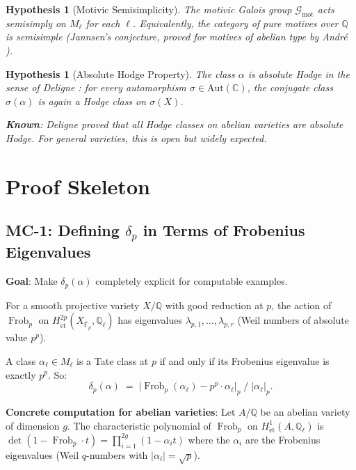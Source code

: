 \documentclass[11pt]{article}
\newtheorem{hypothesis}[lemma]{Hypothesis}
\theoremstyle{definition}
\DeclareMathOperator{\Frob}{Frob}
\begin{document}
\begin{hypothesis}[Motivic Semisimplicity]
\label{hyp:semisimple}
The motivic Galois group $\mathcal{G}_{\mathrm{mot}}$ acts semisimply on
$M_\ell$ for each $\ell$.  Equivalently, the category of pure motives over $\mathbb{Q}$
is semisimple (Jannsen's conjecture, proved for motives of abelian type by Andr\'e \cite{Andre}).
\end{hypothesis}

\begin{hypothesis}[Absolute Hodge Property]
\label{hyp:abs-hodge}
The class $\alpha$ is \emph{absolute Hodge} in the sense of Deligne \cite{Deligne}:
for every automorphism $\sigma \in \mathrm{Aut}(\mathbb{C})$,
the conjugate class $\sigma(\alpha)$ is again a Hodge class on $\sigma(X)$.

\textbf{Known}: Deligne proved that all Hodge classes on abelian varieties are absolute Hodge.
For general varieties, this is open but widely expected.
\end{hypothesis}

\section{Proof Skeleton}

\subsection{MC-1: Defining $\delta_p$ in Terms of Frobenius Eigenvalues}

\textbf{Goal}: Make $\delta_p(\alpha)$ completely explicit for computable examples.

For a smooth projective variety $X/\mathbb{Q}$ with good reduction at $p$,
the action of $\Frob_p$ on $H^{2p}_{\mathrm{\acute{e}t}}(X_{\bar{\mathbb{F}}_p}, \mathbb{Q}_\ell)$
has eigenvalues $\lambda_{p,1}, \ldots, \lambda_{p,r}$ (Weil numbers of absolute value $p^p$).

A class $\alpha_\ell \in M_\ell$ is a Tate class at $p$ if and only if its Frobenius eigenvalue
is exactly $p^p$.  So:
\[
  \delta_p(\alpha) \;=\; \bigl| \Frob_p(\alpha_\ell) - p^p \cdot \alpha_\ell \bigr|_p \;/\; |\alpha_\ell|_p.
\]

\textbf{Concrete computation for abelian varieties}:
Let $A/\mathbb{Q}$ be an abelian variety of dimension $g$.
The characteristic polynomial of $\Frob_p$ on $H^1_{\mathrm{\acute{e}t}}(A, \mathbb{Q}_\ell)$
is $\det(1 - \Frob_p \cdot t) = \prod_{i=1}^{2g}(1 - \alpha_i t)$
where the $\alpha_i$ are the Frobenius eigenvalues (Weil $q$-numbers with $|\alpha_i| = \sqrt{p}$).
\end{document}
